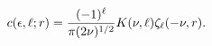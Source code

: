 \[\mathop{c\/}\nolimits\!\left(\epsilon,\ell;r\right)=\frac{(-1)^{\ell}}{\pi(2%
\nu)^{1/2}}K(\nu,\ell)\zeta_{\ell}(-\nu,r).\]